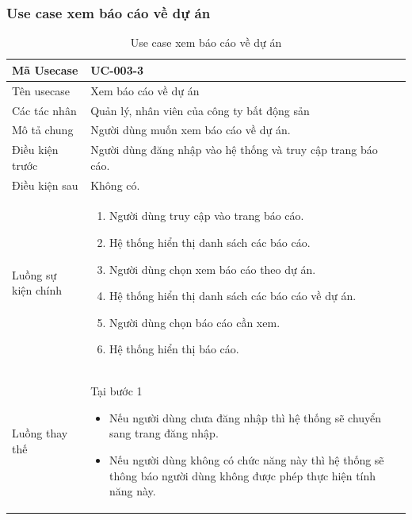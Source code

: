 \documentclass[12pt,a4paper]{article}
\begin{document}
    \subsubsection*{Use case xem báo cáo về dự án}
    \begin{table}[H]
        \centering
        \begin{tabular}{|p{3.5cm}|p{11.5cm}|c|}
            \hline
            Mã Usecase      & UC-003-3                                                     \\
            \hline
            Tên usecase     & Xem báo cáo về dự án                                         \\
            \hline
            Các tác nhân    & Quản lý, nhân viên của công ty bất động sản                  \\
            \hline
            Mô tả chung     & Người dùng muốn xem báo cáo về dự án.                        \\
            \hline
            Điều kiện trước & Người dùng đăng nhập vào hệ thống và truy cập trang báo cáo. \\
            \hline
            Điều kiện sau   & Không có.                                                    \\
            \hline
            Luồng sự kiện chính & \vspace{-.8cm}\begin{enumerate}
                                                    \item Người dùng truy cập vào trang báo cáo.
                                                    \item Hệ thống hiển thị danh sách các báo cáo.
                                                    \item Người dùng chọn xem báo cáo theo dự án.
                                                    \item Hệ thống hiển thị danh sách các báo cáo về dự án.
                                                    \item Người dùng chọn báo cáo cần xem.
                                                    \item Hệ thống hiển thị báo cáo.
            \end{enumerate}
            \\
            \hline
            Luồng thay thế & Tại bước 1\newline
            \vspace{-.8cm}\begin{itemize}
                              \item Nếu người dùng chưa đăng nhập thì hệ thống sẽ chuyển sang trang đăng nhập.
                              \item Nếu người dùng không có chức năng này thì hệ thống sẽ thông báo người dùng không được phép thực hiện tính năng này.
            \end{itemize}
            \\ \hline
        \end{tabular}
        \caption{Use case xem báo cáo về dự án}
    \end{table}
\end{document}
